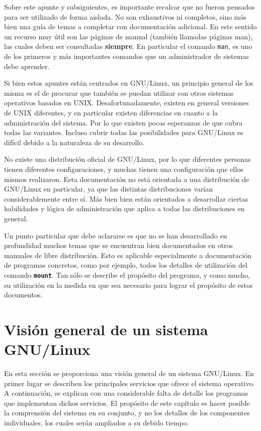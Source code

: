 \documentclass[12pt]{article}
\begin{document}
Sobre este apunte y subsiguientes, es importante recalcar que no fueron
pensados para ser utilizado de forma aislada. No son exhaustivos ni 
completos, sino más bien una guía de temas a completar con 
documentación adicional. En este sentido un recurso muy útil son
las páginas de manual (también llamadas páginas man), las cuales deben ser
consultadas \textbf{siempre}. En particular el comando \texttt{man}, es
 uno de los primeros y más importantes comandos que un administrador de 
sistemas debe aprender.   

Si bien estos apuntes están centrados en GNU/Linux, un principio 
general de los misma es el de procurar que también se puedan utilizar 
con otros sistemas operativos basados en UNIX. Desafortunadamente, 
existen en general versiones de UNIX diferentes, y en
particular existen diferencias en cuanto a la administración del sistema. 
Por lo que existen pocas esperanzas de que cubra todas las variantes.
Incluso cubrir todas las posibilidades para GNU/Linux es difícil debido 
a la naturaleza de su desarrollo. 

No existe una distribución oficial de GNU/Linux, por lo que diferentes
personas tienen diferentes configuraciones, y muchas tienen una 
configuración que ellos mismos realizaron. Esta documentación no está 
orientada a una distribución de GNU/Linux en particular, ya que las 
distintas distribuciones varían considerablemente entre sí. Más bien 
bien están orientados a desarrollar ciertas habilidades y lógica de 
administración que aplica a todas las distribuciones en general. 

Un punto particular que debe aclararse es que no se han desarrollado en
profundidad muchos temas que se encuentran bien documentados en otros 
manuales de libre distribución. Esto es aplicable especialmente a 
documentación de programas concretos, como por ejemplo, todos los 
detalles de utilización del comando \texttt{\textbf{mount}}. Tan sólo se 
describe el propósito del programa, y como mucho, su utilización en la
 medida en que sea necesario para lograr el propósito de estos documentos.


\section{Visión general de un sistema GNU/Linux}

En esta sección se proporciona una visión
general de un sistema GNU/Linux. En primer lugar se describen los 
principales servicios que ofrece el sistema operativo. A continuación, 
se explican con una considerable falta de detalle los programas que 
implementan dichos servicios. El propósito de este capítulo es hacer 
posible la comprensión del sistema en su conjunto, y no los detalles 
de los componentes individuales, los cuales serán ampliados a su debido 
tiempo. 
\end{document}

